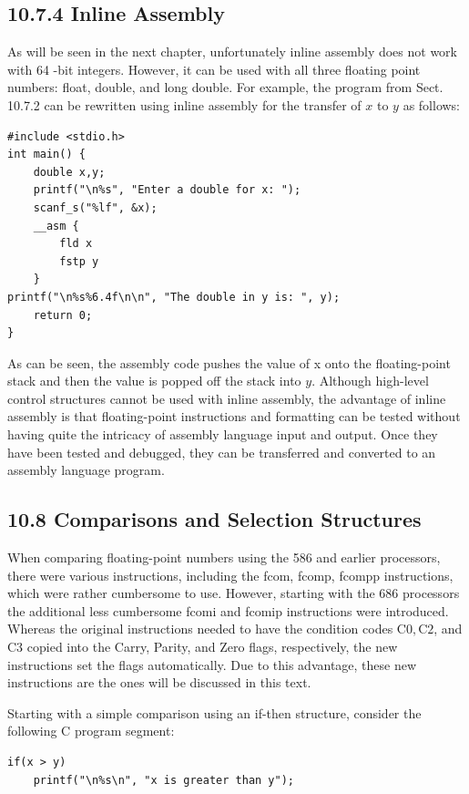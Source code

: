 \documentclass[10pt]{book}
\begin{document}
\begin{center}
\begin{center}
\begin{center}
\begin{center}
\subsection*{10.7.4 Inline Assembly}
As will be seen in the next chapter, unfortunately inline assembly does not work with 64 -bit integers. However, it can be used with all three floating point numbers: float, double, and long double. For example, the program from Sect. 10.7.2 can be rewritten using inline assembly for the transfer of $x$ to $y$ as follows:

\begin{verbatim}
#include <stdio.h>
int main() {
    double x,y;
    printf("\n%s", "Enter a double for x: ");
    scanf_s("%lf", &x);
    __asm {
        fld x
        fstp y
    }
printf("\n%s%6.4f\n\n", "The double in y is: ", y);
    return 0;
}
\end{verbatim}

As can be seen, the assembly code pushes the value of x onto the floating-point stack and then the value is popped off the stack into $y$. Although high-level control structures cannot be used with inline assembly, the advantage of inline assembly is that floating-point instructions and formatting can be tested without having quite the intricacy of assembly language input and output. Once they have been tested and debugged, they can be transferred and converted to an assembly language program.


\subsection*{10.8 Comparisons and Selection Structures}
When comparing floating-point numbers using the 586 and earlier processors, there were various instructions, including the fcom, fcomp, fcompp instructions, which were rather cumbersome to use. However, starting with the 686 processors the additional less cumbersome fcomi and fcomip instructions were introduced. Whereas the original instructions needed to have the condition codes $\mathrm{C} 0, \mathrm{C} 2$, and C3 copied into the Carry, Parity, and Zero flags, respectively, the new instructions set the flags automatically. Due to this advantage, these new instructions are the ones will be discussed in this text.

Starting with a simple comparison using an if-then structure, consider the following C program segment:

\begin{verbatim}
if(x > y)
    printf("\n%s\n", "x is greater than y");
\end{verbatim}


\end{center}
\end{center}
\end{center}
\end{center}
\end{document}
